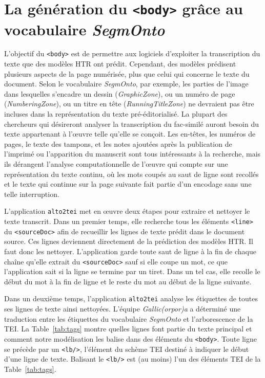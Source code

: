 \documentclass[class=article, crop=false]{standalone}
\begin{document}
\section{La génération du \texttt{<body>} grâce au vocabulaire \textit{SegmOnto}}
L'objectif du \texttt{<body>} est de permettre aux logiciels d'exploiter la transcription du texte que des modèles \acrshort{HTR} ont prédit. Cependant, des modèles prédisent plusieurs aspects de la page numérisée, plus que celui qui concerne le texte du document. Selon le vocabulaire \textit{SegmOnto}, par exemple, les parties de l'image dans lesquelles s'encadre un dessin (\textit{GraphicZone}), ou un numéro de page (\textit{NumberingZone}), ou un titre en tête (\textit{RunningTitleZone}) ne devraient pas être incluses dans la représentation du texte pré-éditorialisé. La plupart des chercheurs qui désireront analyser la transcription du fac-similé auront besoin du texte appartenant à l'œuvre telle qu'elle se conçoit. Les en-têtes, les numéros de pages, le texte des tampons, et les notes ajoutées après la publication de l'imprimé ou l'apparition du manuscrit sont tous intéressants à la recherche, mais ils dérangent l'analyse computationnelle de l'œuvre qui compte sur une représentation du texte continu, où les mots coupés au saut de ligne sont recollés et le texte qui continue sur la page suivante fait partie d'un encodage sans une telle interruption.

L'application \texttt{alto2tei} met en œuvre deux étapes pour extraire et nettoyer le texte transcrit. Dans un premier temps, elle recherche tous les éléments \texttt{<line>} du \texttt{<sourceDoc>} afin de recueillir les lignes de texte prédit dans le document source. Ces lignes deviennent directement de la prédiction des modèles \acrshort{HTR}. Il faut donc les nettoyer. L'application garde toute saut de ligne à la fin de chaque chaîne qu'elle extrait du \texttt{<sourceDoc>} sauf si elle coupe un mot, ce que l'application sait si la ligne se termine par un tiret. Dans un tel cas, elle recolle le début du mot à la fin de ligne et le reste du mot au début de la ligne suivante.

Dans un deuxième temps, l'application \texttt{alto2tei} analyse les étiquettes de toutes ses lignes de texte ainsi nettoyées. L'équipe \textit{Gallic(orpor)a} a déterminé une traduction entre les étiquettes du vocabulaire \textit{SegmOnto} et l'arborescence de la \acrshort{TEI}. La Table~\ref{tab:tags} montre quelles lignes font partie du texte principal et comment notre modélisation les balise dans des éléments du \texttt{<body>}. Toute ligne se précède par un \texttt{<lb/>}, l'élément du schème \acrshort{TEI} destiné à indiquer le début d'une ligne de texte. Balisant le \texttt{<lb/>} est (au moins) l'un des éléments \acrshort{TEI} de la Table~\ref{tab:tags}.
\end{document}
